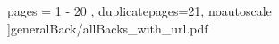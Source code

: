 \documentclass[letterpaper]{article}
\begin{document}

	pages = 	{ 1 - 20 },
						duplicatepages=21,
						noautoscale
					]{generalBack/allBacks_with_url.pdf}
\end{document}
